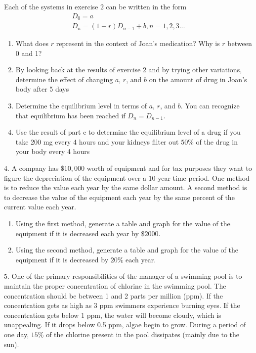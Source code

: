\documentclass[10pt,]{book}
\theoremstyle{plain}
\theoremstyle{definition}
\theoremstyle{definition}
\theoremstyle{definition}
\numberwithin{equation}{section}
\begin{document}
\begin{exerciselist}
Each of the systems in exercise 2 can be written in the form%
\begin{gather*}
D_0=a\\
D_n=(1-r) D_{n-1}+b, n=1,2,3...
\end{gather*}
\leavevmode%
\begin{enumerate}[label=(\alph*)]
\item\hypertarget{li-15}{}What does \(r\) represent in the context of Joan's medication?  Why is \(r\) between 0 and 1?%
\item\hypertarget{li-16}{}By looking back at the results of exercise 2 and by trying other variations, determine the effect of changing \(a\), \(r\), and \(b\) on the amount of drug in Joan's body after 5 days%
\item\hypertarget{li-17}{}Determine the equilibrium level in terms of \(a\), \(r\), and \(b\).  You can recognize that equilibrium has been reached if  \(D_n=D_{n-1}\).%
\item\hypertarget{li-18}{}Use the result of part c to determine the equilibrium level of a drug if you take 200 mg every 4 hours and your kidneys filter out \(50\%\) of the drug in your body every 4 hours%
\end{enumerate}
%
\par\smallskip
\item[4.]\hypertarget{exercise-6}{}\hypertarget{p-24}{}%
A company has \(\$10,000\) worth of equipment and for tax purposes they want to figure the depreciation of the equipment over a 10-year time period.  One method is to reduce the value each year by the same dollar amount.  A second method is to decrease the value of the equipment each year by the same percent of the current value each year. \leavevmode%
\begin{enumerate}[label=(\alph*)]
\item\hypertarget{li-19}{}Using the first method, generate a table and graph for the value of the equipment if it is  decreased each year by \(\$2000\).%
\item\hypertarget{li-20}{}Using the second method, generate a table and graph for the value of the equipment if it is decreased by \(20\%\) each year.%
\end{enumerate}
%
\par\smallskip
\item[5.]\hypertarget{exercise-7}{}\hypertarget{p-25}{}%
One of the primary responsibilities of the manager of a swimming pool is to maintain the proper concentration of chlorine in the swimming pool.  The concentration should be between 1 and 2 parts per million (ppm).  If the concentration gets as high as 3 ppm swimmers experience burning eyes.  If the concentration gets below 1 ppm, the water will become cloudy, which is unappealing.  If it drops below 0.5 ppm, algae begin to grow.  During a period of one day, \(15\%\) of the chlorine present in the pool dissipates (mainly due to the sun). \leavevmode%

\end{exerciselist}
\end{document}
